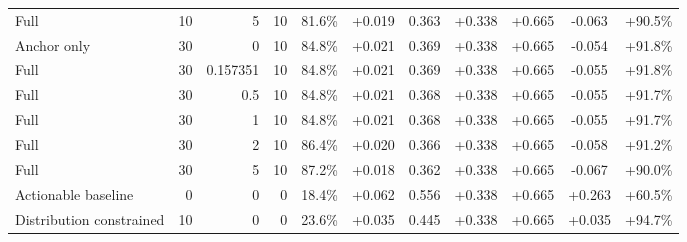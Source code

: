 \begin{table}[htbp]
\begin{tabular}{lrrrccccccc}
Full & 10 & 5 & 10 & 81.6\% & +0.019 & 0.363 & +0.338 & +0.665 & -0.063 & +90.5\% \\
Anchor only & 30 & 0 & 10 & 84.8\% & +0.021 & 0.369 & +0.338 & +0.665 & -0.054 & +91.8\% \\
Full & 30 & 0.157351 & 10 & 84.8\% & +0.021 & 0.369 & +0.338 & +0.665 & -0.055 & +91.8\% \\
Full & 30 & 0.5 & 10 & 84.8\% & +0.021 & 0.368 & +0.338 & +0.665 & -0.055 & +91.7\% \\
Full & 30 & 1 & 10 & 84.8\% & +0.021 & 0.368 & +0.338 & +0.665 & -0.055 & +91.7\% \\
Full & 30 & 2 & 10 & 86.4\% & +0.020 & 0.366 & +0.338 & +0.665 & -0.058 & +91.2\% \\
Full & 30 & 5 & 10 & 87.2\% & +0.018 & 0.362 & +0.338 & +0.665 & -0.067 & +90.0\% \\
Actionable baseline & 0 & 0 & 0 & 18.4\% & +0.062 & 0.556 & +0.338 & +0.665 & +0.263 & +60.5\% \\
Distribution constrained & 10 & 0 & 0 & 23.6\% & +0.035 & 0.445 & +0.338 & +0.665 & +0.035 & +94.7\% \\
\bottomrule
\end{tabular}
\end{table}